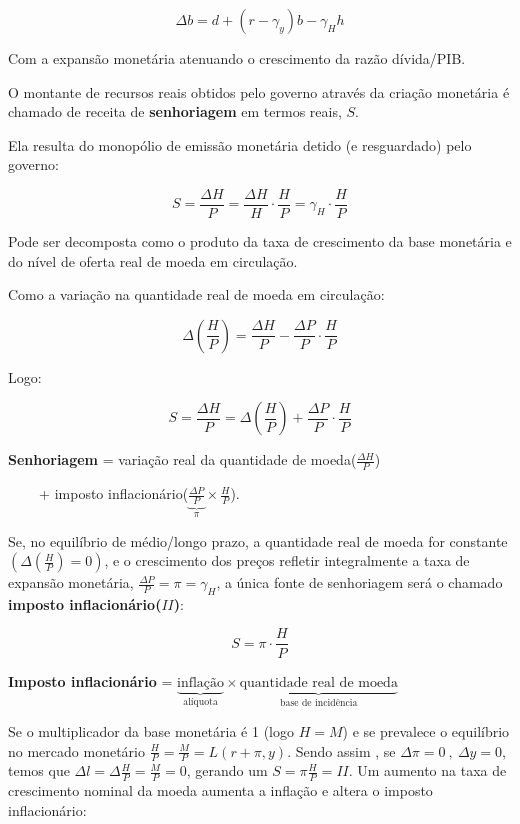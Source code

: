 \documentclass[a4paper,12pt]{article}[abntex2]
\begin{document}
\[
\Delta b = d + (r - \gamma_y)b - \gamma_H h
\]

Com a expansão monetária atenuando o crescimento da razão dívida/PIB.

O montante de recursos reais obtidos pelo governo através da criação monetária é chamado de receita de \textbf{senhoriagem} em termos reais, \(S\).

Ela resulta do monopólio de emissão monetária detido (e resguardado) pelo governo:

\[
S = \frac{\Delta H}{P} = \frac{\Delta H}{H} \cdot \frac{H}{P} = \gamma_H \cdot \frac{H}{P}
\]

Pode ser decomposta como o produto da taxa de crescimento da base monetária e do nível de oferta real de moeda em circulação.

Como a variação na quantidade real de moeda em circulação:

\[
\Delta \left( \frac{H}{P} \right) = \frac{\Delta H}{P} - \frac{\Delta P}{P} \cdot \frac{H}{P}
\]

Logo:

\[
S = \frac{\Delta H}{P} = \Delta \left( \frac{H}{P} \right) + \frac{\Delta P}{P} \cdot \frac{H}{P}
\]

\textbf{Senhoriagem} = variação real da quantidade de moeda(\(\frac{\Delta H}{P} \)) 

\(\quad \quad \  \)+ imposto inflacionário(\(\underbrace{\frac{\Delta P}{P}}_{\pi}\times\frac{H}{P}\)).

Se, no equilíbrio de médio/longo prazo, a quantidade real de moeda for constante \(\left(\Delta \left( \frac{H}{P} \right) = 0\right)\),  
e o crescimento dos preços refletir integralmente a taxa de expansão monetária, \(\frac{\Delta P}{P} = \pi = \gamma_H\),  
a única fonte de senhoriagem será o chamado \textbf{imposto inflacionário(\(II\))}:

\[
S = \pi \cdot \frac{H}{P}
\]

\textbf{Imposto inflacionário} = \(\underbrace{\text{inflação}}_{\text{alíquota}} \times \underbrace{\text{quantidade real de moeda}}_{\text{base de incidência}}\)

Se o multiplicador da base monetária é 1 (logo \(H = M\))  
e se prevalece o equilíbrio no mercado monetário \(\frac{H}{P}=\frac{M}{P} = L(r + \pi, y)\). Sendo assim , se \(\Delta\pi =0 \ , \ \Delta y=0\), temos que \(\Delta l = \Delta\frac{H}{P}= \frac{M}{P}=0\), gerando um \(S=\pi\frac{H}{P}=II\). Um aumento na taxa de crescimento nominal da moeda aumenta a inflação e altera o imposto inflacionário:
\end{document}
